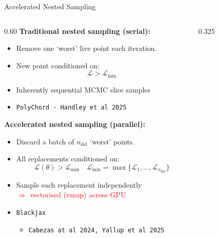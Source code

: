 \documentclass{beamer}
\begin{document}
\begin{frame}{Accelerated Nested Sampling}
\vspace{-0.5em}
\begin{columns}
    \begin{column}{0.60\textwidth}
    \scriptsize
    \textbf{Traditional nested sampling (serial):}
    \begin{itemize}
        \item Remove one `worst' live point each iteration.
        \item New point conditioned on:
        \vspace{-1em}
        $$
        \mathcal{L} > \mathcal{L}_{\min}
        $$
        \item Inherently sequential MCMC slice samples
        \item \texttt{PolyChord - Handley et al 2025}
    \end{itemize}
    \vspace{1em}
    \hline
    \vspace{1em}
    \textbf{Accelerated nested sampling (parallel):}
    \begin{itemize}
        \item Discard a batch of $n_{\text{del}}$ `worst' points.
        \item All replacements conditioned on:
        \vspace{-1em}
        \[
        \mathcal{L}(\theta) > \mathcal{L}_{\min}
        \quad
        \mathcal{L}_{\min} = \max\{\mathcal{L}_1, \ldots, \mathcal{L}_{n_{\text{del}}}\}
        \]
        \item Sample each replacement independently \\ 
              \textcolor{red}{$\Rightarrow$ vectorised (vmap) across GPU}
        \item \texttt{Blackjax}
        \begin{itemize}
        \scriptsize
            \item \texttt{Cabezas at al 2024, Yallup et al 2025}
        \end{itemize} 
    \end{itemize}
 
    \end{column}

    \begin{column}{0.325\textwidth}
        \vspace{0.6em}
        \begin{figure}
            \centering


\end{figure}
\end{column}
\end{columns}
\end{frame}
\end{document}
